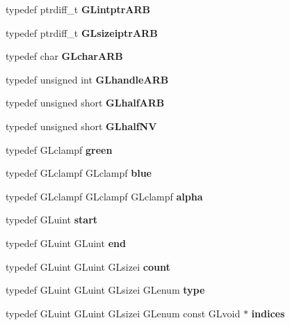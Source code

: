 \begin{DoxyCompactItemize}
\item 
typedef ptrdiff\+\_\+t {\bfseries G\+Lintptr\+A\+R\+B}\label{_s_d_l__opengl_8h_a5077b8a49fe00b9e912f4e0587697fc7}

\item 
typedef ptrdiff\+\_\+t {\bfseries G\+Lsizeiptr\+A\+R\+B}\label{_s_d_l__opengl_8h_a229b8be5cc4beaa309119690e9ec4033}

\item 
typedef char {\bfseries G\+Lchar\+A\+R\+B}\label{_s_d_l__opengl_8h_ac2f31b59b9462b23a2631eb005e07b51}

\item 
typedef unsigned int {\bfseries G\+Lhandle\+A\+R\+B}\label{_s_d_l__opengl_8h_a97b4493b005afc03858a4a45e2fc4128}

\item 
typedef unsigned short {\bfseries G\+Lhalf\+A\+R\+B}\label{_s_d_l__opengl_8h_ad59bbe9a8295f324087b6a3bd454bac4}

\item 
typedef unsigned short {\bfseries G\+Lhalf\+N\+V}\label{_s_d_l__opengl_8h_a31e7c1ab4b4de65e6e375457b9d9e905}

\item 
typedef G\+Lclampf {\bfseries green}\label{_s_d_l__opengl_8h_ac57fb4e15aa855fa227d97909b37ed5b}

\item 
typedef G\+Lclampf G\+Lclampf {\bfseries blue}\label{_s_d_l__opengl_8h_af7c76492ef0f7ddda2f5f079041e5a8e}

\item 
typedef G\+Lclampf G\+Lclampf G\+Lclampf {\bfseries alpha}\label{_s_d_l__opengl_8h_a1e566ae365860db53d0c241c526b52c3}

\item 
typedef G\+Luint {\bfseries start}\label{_s_d_l__opengl_8h_ac55adc720a3098c1b454d2a4647f4361}

\item 
typedef G\+Luint G\+Luint {\bfseries end}\label{_s_d_l__opengl_8h_a432111147038972f06e049e18a837002}

\item 
typedef G\+Luint G\+Luint G\+Lsizei {\bfseries count}\label{_s_d_l__opengl_8h_a7ec41a71042dd94e554df761eed6b51b}

\item 
typedef G\+Luint G\+Luint G\+Lsizei G\+Lenum {\bfseries type}\label{_s_d_l__opengl_8h_a7d05960f4f1c1b11f3177dc963a45d86}

\item 
typedef G\+Luint G\+Luint G\+Lsizei G\+Lenum const G\+Lvoid $\ast$ {\bfseries indices}\label{_s_d_l__opengl_8h_a0c1a6a349ce1520ca0284e13dcad1f86}


\end{DoxyCompactItemize}
